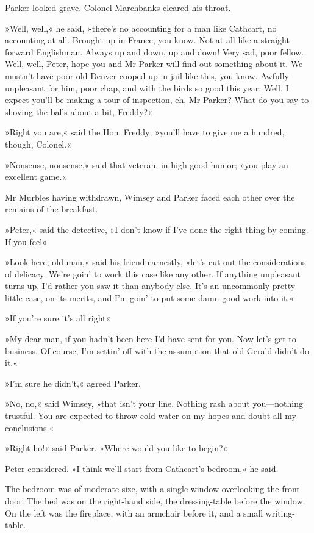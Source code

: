 Parker looked grave. Colonel Marchbanks cleared his throat.

»Well, well,« he said, »there's no accounting for a man like Cathcart, no accounting at all. Brought up in France, you know. Not at all like a straight-forward Englishman. Always up and down, up and down! Very sad, poor fellow. Well, well, Peter, hope you and Mr Parker will find out something about it. We mustn't have poor old Denver cooped up in jail like this, you know. Awfully unpleasant for him, poor chap, and with the birds so good this year. Well, I expect you'll be making a tour of inspection, eh, Mr Parker? What do you say to shoving the balls about a bit, Freddy?«

»Right you are,« said the Hon. Freddy; »you'll have to give me a hundred, though, Colonel.«

»Nonsense, nonsense,« said that veteran, in high good humor; »you play an excellent game.«

Mr Murbles having withdrawn, Wimsey and Parker faced each other over the remains of the breakfast.

»Peter,« said the detective, »I don't know if I've done the right thing by coming. If you feel\longdash«

»Look here, old man,« said his friend earnestly, »let's cut out the considerations of delicacy. We're goin' to work this case like any other. If anything unpleasant turns up, I'd rather you saw it than anybody else. It's an uncommonly pretty little case, on its merits, and I'm goin' to put some damn good work into it.«

»If you're sure it's all right\longdash«

»My dear man, if you hadn't been here I'd have sent for you. Now let's get to business. Of course, I'm settin' off with the assumption that old Gerald didn't do it.«

»I'm sure he didn't,« agreed Parker.

»No, no,« said Wimsey, »that isn't your line. Nothing rash about you\allowbreak---\allowbreak nothing trustful. You are expected to throw cold water on my hopes and doubt all my conclusions.«

»Right ho!« said Parker. »Where would you like to begin?«

Peter considered. »I think we'll start from Cathcart's bedroom,« he said.

The bedroom was of moderate size, with a single window overlooking the front door. The bed was on the right-hand side, the dressing-table before the window. On the left was the fireplace, with an armchair before it, and a small writing-table.

